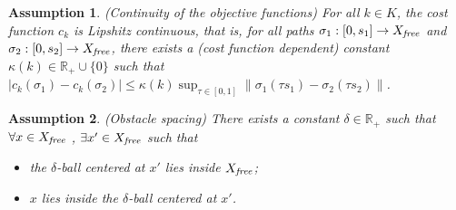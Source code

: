 \documentclass{article}
\newtheorem{asmp}{Assumption}
\begin{document}



\begin{asmp}{(Continuity of the objective functions)}
\label{asmp:continuity}
For all $k\in K$, the cost function $c_{k}$ is Lipshitz continuous, that is, for all paths $\sigma_1 : [0, s_{1}] \rightarrow X_{\it free}$ and $ \sigma_2 : [0, s_{2}] \rightarrow X_{\it free}$, there exists a (cost function dependent) constant $\kappa(k)\in \mathbb{R}_{+}\cup \{0 \}$ such that $ | c_{k} ( \sigma_{1} ) - c_{k} ( \sigma_{2} ) | \leq \kappa(k) \sup_{\tau \in [0, 1]} \lVert \sigma_{1} (\tau s_{1}) - \sigma_{2} (\tau s_{2}) \rVert $.
\end{asmp}


\begin{asmp}{(Obstacle spacing)}
\label{asmp:spacing}
There exists a constant $ \delta \in \mathbb{R}_{+} $ such that $ \forall x \in X_{\it free} $ , $ \exists x' \in X_{\it free} $ such that
\begin{itemize}
\item the $ \delta $-ball centered at $ x' $ lies inside $ X_{\it free} $;
\item $ x $ lies inside the $ \delta $-ball centered at $ x' $.
\end{itemize}
\end{asmp}
\end{document}
